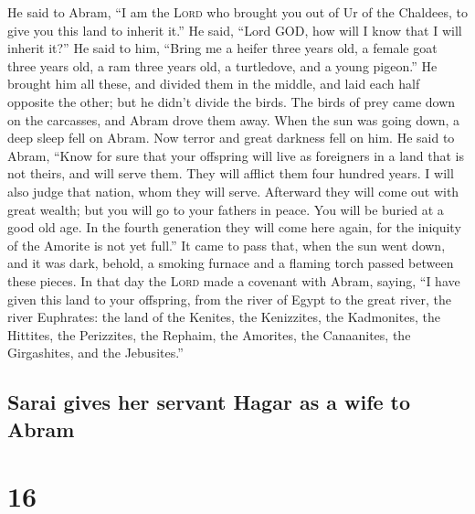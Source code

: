  He said to Abram, ``I am the \textsc{Lord} who brought
you out of Ur of the Chaldees, to give you this land to inherit it.''
 He said, ``Lord GOD, how will I know that I will inherit
it?''  He said to him, ``Bring me a heifer three years
old, a female goat three years old, a ram three years old, a turtledove,
and a young pigeon.''  He brought him all these, and
divided them in the middle, and laid each half opposite the other; but
he didn't divide the birds.  The birds of prey came down
on the carcasses, and Abram drove them away.  When the
sun was going down, a deep sleep fell on Abram. Now terror and great
darkness fell on him.  He said to Abram, ``Know for sure
that your offspring will live as foreigners in a land that is not
theirs, and will serve them. They will afflict them four hundred years.
 I will also judge that nation, whom they will serve.
Afterward they will come out with great wealth;  but you
will go to your fathers in peace. You will be buried at a good old age.
 In the fourth generation they will come here again, for
the iniquity of the Amorite is not yet full.''  It came
to pass that, when the sun went down, and it was dark, behold, a smoking
furnace and a flaming torch passed between these pieces. 
In that day the \textsc{Lord} made a covenant with Abram, saying, ``I
have given this land to your offspring, from the river of Egypt to the
great river, the river Euphrates:  the land of the
Kenites, the Kenizzites, the Kadmonites,  the Hittites,
the Perizzites, the Rephaim,  the Amorites, the
Canaanites, the Girgashites, and the Jebusites.''

\hypertarget{sarai-gives-her-servant-hagar-as-a-wife-to-abram}{%
\subsection{Sarai gives her servant Hagar as a wife to
Abram}\label{sarai-gives-her-servant-hagar-as-a-wife-to-abram}}

\hypertarget{section-15}{%
\section{16}\label{section-15}}

